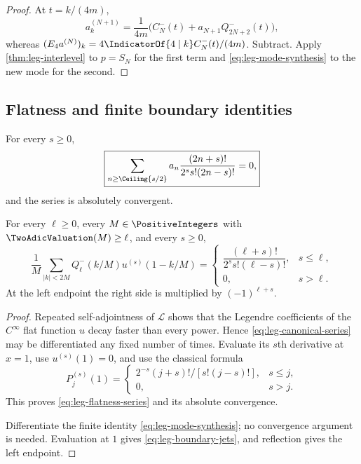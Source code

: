 {\begin{proof}
At $t=k/(4m)$,
\[
 a_k^{(N+1)}
 =\frac1{4m}\bigl(C_N^-(t)+a_{N+1}Q_{2N+2}^-(t)\bigr),
\]
whereas $(E_4a^{(N)})_k=
4\IndicatorOf{4\mid k}C_N^-(t)/(4m)$.  Subtract.  Apply
\cref{thm:leg-interlevel} to $p=S_N$ for the first term and
\eqref{eq:leg-mode-synthesis} to the new mode for the second.
\end{proof}

\subsection{Flatness and finite boundary identities}

\begin{theorem}
\label{thm:leg-flatness}
For every $s\ge0$,
\begin{equation}
 \boxed{
 \sum_{n\ge\Ceiling{s/2}}
 a_n\frac{(2n+s)!}{2^ss!(2n-s)!}=0,}
 \label{eq:leg-flatness-series}
\end{equation}
and the series is absolutely convergent.

For every $\ell\ge0$, every $M\in\PositiveIntegers$ with $\TwoAdicValuation(M)\ge\ell$, and
every $s\ge0$,
\begin{equation}
 \boxed{
 \frac1M\sum_{|k|<2M}Q_\ell^-(k/M)u^{(s)}(1-k/M)
 =
 \begin{cases}
 \dfrac{(\ell+s)!}{2^ss!(\ell-s)!},&s\le\ell,\\[0.7em]
 0,&s>\ell.
 \end{cases}}
 \label{eq:leg-boundary-jets}
\end{equation}
At the left endpoint the right side is multiplied by
$(-1)^{\ell+s}$.
\end{theorem}

\begin{proof}
Repeated self-adjointness of $\mathcal L$ shows that the Legendre
coefficients of the $C^\infty$ flat function $u$ decay faster than every
power.  Hence \eqref{eq:leg-canonical-series} may be differentiated any fixed
number of times.  Evaluate its $s$th derivative at $x=1$, use
$u^{(s)}(1)=0$, and use the classical formula
\[
 P_j^{(s)}(1)=
 \begin{cases}
 2^{-s}(j+s)!/[s!(j-s)!],&s\le j,\\
 0,&s>j.
 \end{cases}
\]
This proves \eqref{eq:leg-flatness-series} and its absolute convergence.

Differentiate the finite identity \eqref{eq:leg-mode-synthesis}; no
convergence argument is needed.  Evaluation at $1$ gives
\eqref{eq:leg-boundary-jets}, and reflection gives the left endpoint.
\end{proof}

}
